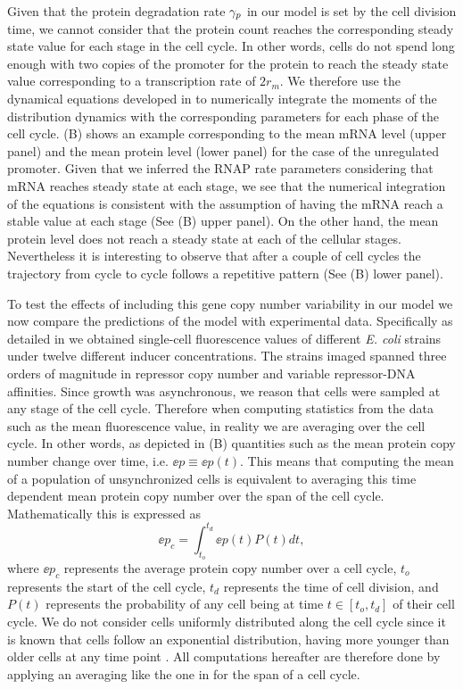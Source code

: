 Given that the protein degradation rate $\gamma _p$ in our model is set by the cell
division time, we cannot consider that the protein count reaches the
corresponding steady state value for each stage in the cell cycle. In other
words, cells do not spend long enough with two copies of the promoter for the
protein to reach the steady state value corresponding to a transcription rate of
$2 r_m$. We therefore use the dynamical equations developed in
 to numerically integrate the moments of the distribution
dynamics with the corresponding parameters for each phase of the cell cycle.
(B) shows an example corresponding to the mean mRNA level
(upper panel) and the mean protein level (lower panel) for the case of the
unregulated promoter. Given that we inferred the RNAP rate parameters
considering that mRNA reaches steady state at each stage, we see that the
numerical integration of the equations is consistent with the assumption of
having the mRNA reach a stable value at each stage (See
(B) upper panel). On the other hand, the mean protein
level does not reach a steady state at each of the cellular stages. Nevertheless
it is interesting to observe that after a couple of cell cycles the trajectory
from cycle to cycle follows a repetitive pattern (See (B)
lower panel).

To test the effects of including this gene copy number variability in our model
we now compare the predictions of the model with experimental data. Specifically
as detailed in  we obtained single-cell fluorescence values of
different {\it E. coli} strains under twelve different inducer concentrations.
The strains imaged spanned three orders of magnitude in repressor copy number
and variable repressor-DNA affinities. Since growth was asynchronous, we reason
that cells were sampled at any stage of the cell cycle. Therefore when computing
statistics from the data such as the mean fluorescence value, in reality we are
averaging over the cell cycle. In other words, as depicted in
(B) quantities such as the mean protein copy number change
over time, i.e. $\ee{p} \equiv \ee{p(t)}$. This means that computing the mean of
a population of unsynchronized cells is equivalent to averaging this time
dependent mean protein copy number over the span of the cell cycle.
Mathematically this is expressed as
\begin{equation}
	\ee{p}_c = \int_{t_o}^{t_d} \ee{p(t)} P(t) dt,
	\label{eq_time_avg}
\end{equation}
where $\ee{p}_c$ represents the average protein copy number over a cell cycle,
$t_o$ represents the start of the cell cycle, $t_d$ represents the time of cell
division, and $P(t)$ represents the probability of any cell being at time $t \in
[t_o, t_d]$ of their cell cycle. We do not consider cells uniformly distributed
along the cell cycle since it is known that cells follow an exponential
distribution, having more younger than older cells at any time point
\cite{Powell1956}. All computations hereafter are therefore done by applying an
averaging like the one in  for the span of a cell cycle.

